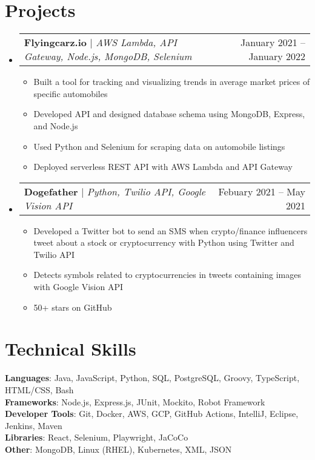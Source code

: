 \documentclass[letterpaper,11pt]{article}
\makeatletter
\newcommand{\resumeItem}[1]{
  \item\small{
    {#1 \vspace{-2pt}}
  }
}
\newcommand{\resumeProjectHeading}[2]{
    \item
    \begin{tabular*}{0.97\textwidth}{l@{\extracolsep{\fill}}r}
      \small#1 & #2 \\
    \end{tabular*}\vspace{-7pt}
}
\newcommand{\resumeSubHeadingListStart}{\begin{itemize}[leftmargin=0.15in, label={}]}
\newcommand{\resumeSubHeadingListEnd}{\end{itemize}}
\newcommand{\resumeItemListStart}{\begin{itemize}}
\newcommand{\resumeItemListEnd}{\end{itemize}\vspace{-5pt}}
\makeatother
\begin{document}
\section{Projects}
    \resumeSubHeadingListStart
      \resumeProjectHeading
          {\textbf{Flyingcarz.io} $|$ \emph{AWS Lambda, API Gateway, Node.js, MongoDB, Selenium}}{January 2021 -- January 2022}
          \resumeItemListStart
            \resumeItem{Built a tool for tracking and visualizing trends in average market prices of specific automobiles}
            \resumeItem{Developed API and designed database schema using MongoDB, Express, and Node.js}
            \resumeItem{Used Python and Selenium for scraping data on automobile listings}
            \resumeItem{Deployed serverless REST API with AWS Lambda and API Gateway}
          \resumeItemListEnd
      \resumeProjectHeading
          {\textbf{Dogefather} $|$ \emph{Python, Twilio API, Google Vision API}}{Febuary 2021 -- May 2021}
          \resumeItemListStart
            \resumeItem{Developed a Twitter bot to send an SMS when crypto/finance influencers tweet about a stock or
            cryptocurrency with Python using Twitter and Twilio API}
            \resumeItem{Detects symbols related to cryptocurrencies in tweets containing images with Google Vision API}
            \resumeItem{50+ stars on GitHub}
          \resumeItemListEnd
    \resumeSubHeadingListEnd



%
\section{Technical Skills}
 \begin{itemize}[leftmargin=0.15in, label={}]
    \small{\item{
     \textbf{Languages}{: Java, JavaScript, Python, SQL, PostgreSQL, Groovy, TypeScript, HTML/CSS, Bash} \\
     \textbf{Frameworks}{: Node.js, Express.js, JUnit, Mockito, Robot Framework} \\
     \textbf{Developer Tools}{: Git, Docker, AWS, GCP, GitHub Actions, IntelliJ, Eclipse, Jenkins, Maven} \\
     \textbf{Libraries}{: React, Selenium, Playwright, JaCoCo} \\
     \textbf{Other}{: MongoDB, Linux (RHEL), Kubernetes, XML, JSON}
    }}
 \end{itemize}


\end{document}
